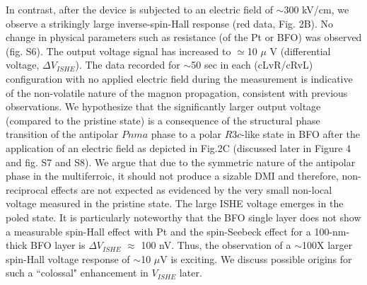 \documentclass[12pt]{article}
\begin{document}
In contrast, after the device is subjected to an electric field of $\sim$300 kV/cm, we observe a strikingly large inverse-spin-Hall response (red data, Fig. 2B). No change in physical parameters such as resistance (of the Pt or BFO) was observed (fig. S6). The output voltage signal has increased to $\simeq$10 $\mu$ V (differential voltage, $\Delta V_{ISHE}$). %
The data recorded for $\sim$50 sec in each (cLvR/cRvL) configuration with no applied electric field during the measurement is indicative of the non-volatile nature of the magnon propagation, consistent with previous observations\cite{parsonnet2022nonvolatile,husain2024non}. We hypothesize that the significantly larger output voltage (compared to the pristine state) is a consequence of the structural phase transition of the antipolar $Pnma$ phase to a polar $R3c$-like state in BFO after the application of an electric field as depicted in Fig.2C (discussed later in Figure 4 and fig. S7 and S8). We argue that due to the symmetric nature of the antipolar phase in the multiferroic, it should not produce a sizable DMI and therefore, non-reciprocal effects are not expected as evidenced by the very small non-local voltage measured in the pristine state. The large ISHE voltage emerges in the poled state. It is particularly noteworthy that the BFO single layer does not show a measurable spin-Hall effect with Pt\cite{parsonnet2022nonvolatile,husain2024non} and the spin-Seebeck effect for a 100-nm-thick BFO layer is  $\Delta V_{ISHE}$ $\approx$ 100 nV. Thus, the observation of a $\sim$100X larger spin-Hall voltage response of $\sim$10 $\mu$V is exciting. We discuss possible origins for such a ``colossal" enhancement in $V_{ISHE}$ later. 
\end{document}
